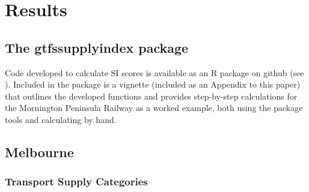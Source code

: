\documentclass[preprint, 3p,
authoryear]{elsarticle} %
\begin{document}
\section{Results}\label{results}

\subsection{The gtfssupplyindex
package}\label{the-gtfssupplyindex-package}

Code developed to calculate SI scores is available as an R package on
github (see \citet{gtfssupplyindex_github}). Included in the package is
a vignette (included as an Appendix to this paper) that outlines the
developed functions and provides step-by-step calculations for the
Mornington Peninsula Railway as a worked example, both using the package
tools and calculating by hand.

\subsection{Melbourne}\label{melbourne}

\subsubsection{Transport Supply
Categories}\label{transport-supply-categories}
\end{document}
